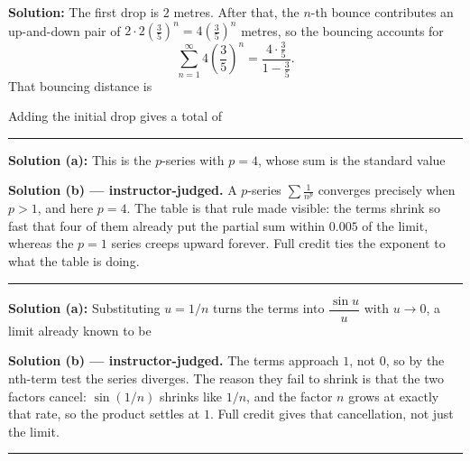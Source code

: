 \documentclass[12pt]{article}
\begin{document}

\textbf{Solution:} The first drop is $2$ metres. After that, the $n$-th bounce contributes an up-and-down pair of $2 \cdot 2\left(\frac{3}{5}\right)^n = 4\left(\frac{3}{5}\right)^n$ metres, so the bouncing accounts for
\[ \sum_{n=1}^{\infty} 4\left(\frac{3}{5}\right)^{n} = \frac{4\cdot\frac{3}{5}}{1 - \frac{3}{5}}. \]
That bouncing distance is 

Adding the initial drop gives a total of 

\vspace{0.2cm}\noindent\rule{\linewidth}{0.2pt}\vspace{0.2cm}


\textbf{Solution (a):} This is the $p$-series with $p = 4$, whose sum is the standard value 

\textbf{Solution (b) --- instructor-judged.} A $p$-series $\sum \frac{1}{n^p}$ converges precisely when $p > 1$, and here $p = 4$. The table is that rule made visible: the terms shrink so fast that four of them already put the partial sum within $0.005$ of the limit, whereas the $p = 1$ series creeps upward forever. Full credit ties the exponent to what the table is doing.

\vspace{0.2cm}\noindent\rule{\linewidth}{0.2pt}\vspace{0.2cm}


\textbf{Solution (a):} Substituting $u = 1/n$ turns the terms into $\dfrac{\sin u}{u}$ with $u \to 0$, a limit already known to be 

\textbf{Solution (b) --- instructor-judged.} The terms approach $1$, not $0$, so by the nth-term test the series diverges. The reason they fail to shrink is that the two factors cancel: $\sin(1/n)$ shrinks like $1/n$, and the factor $n$ grows at exactly that rate, so the product settles at $1$. Full credit gives that cancellation, not just the limit.

\vspace{0.2cm}\noindent\rule{\linewidth}{0.2pt}\vspace{0.2cm}
\end{document}

